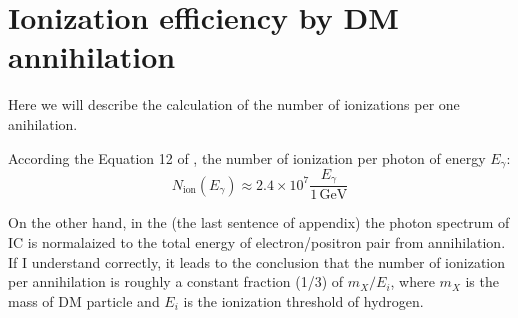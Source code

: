 \section{Ionization efficiency by DM annihilation}
\label{sec:DMspectrum}



Here we will describe the calculation of the number of ionizations per one anihilation.

According the Equation 12 of \cite{Belikov_2009}, the number of ionization per photon of energy $E_\gamma$:
\begin{equation}
N_\mathrm{ion}(E_\gamma) \approx 2.4\times10^7\dfrac{E_\gamma}{1\,\mathrm{GeV}}
\end{equation}

On the other hand, in the \cite{Belikov_2010} (the last sentence of appendix) the photon spectrum of IC is normalaized to the total energy of electron/positron pair from annihilation. If I understand correctly, it leads to the conclusion that the number of ionization per annihilation is roughly a constant fraction (1/3) of $m_X/E_i$, where $m_X$ is the mass of DM particle and $E_i$ is the ionization threshold of hydrogen.
    